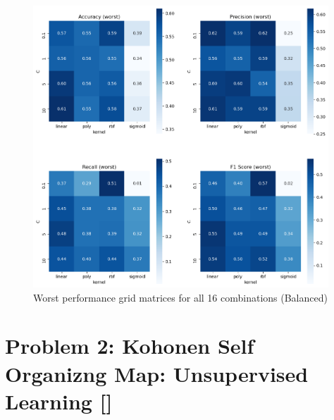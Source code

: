 \documentclass{tron}
\begin{document}
\begin{figure}[H]
\centering
	\includegraphics[height=400px]{../src_code/output/p1/balance/Summary_balance_worst}
	\caption{Worst performance grid matrices for all 16 combinations (Balanced)}
	\label{table:balanced:performance-grid:worst}
\end{figure}



\newpage
\section{Problem 2: Kohonen Self Organizng Map: Unsupervised Learning []}
%	
%	
%	
%	
\end{document}
